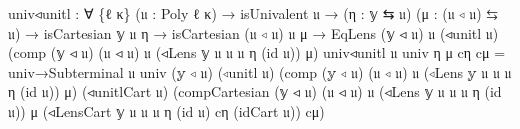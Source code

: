 \documentclass[
  11pt,
  oneside,
  article]{memoir}
\newenvironment{Shaded}{}{}
\newcommand{\NormalTok}[1]{#1}
\newcommand{\OtherTok}[1]{\textcolor[rgb]{0.00,0.44,0.13}{#1}}
\theoremstyle{definition}
\theoremstyle{plain}
\newcommand{\0}{\textsf{0}}
\newcommand{\1}{\tn{\textsf{1}}}
\begin{document}
\begin{Shaded}
\begin{Highlighting}[]
\NormalTok{univ◃unitl }\OtherTok{:} \OtherTok{∀} \OtherTok{\{}\NormalTok{ℓ κ}\OtherTok{\}} \OtherTok{(}\NormalTok{𝔲 }\OtherTok{:}\NormalTok{ Poly ℓ κ}\OtherTok{)} \OtherTok{→}\NormalTok{ isUnivalent 𝔲}
             \OtherTok{→} \OtherTok{(}\NormalTok{η }\OtherTok{:}\NormalTok{ 𝕪 ⇆ 𝔲}\OtherTok{)} \OtherTok{(}\NormalTok{μ }\OtherTok{:} \OtherTok{(}\NormalTok{𝔲 ◃ 𝔲}\OtherTok{)}\NormalTok{ ⇆ 𝔲}\OtherTok{)}
             \OtherTok{→}\NormalTok{ isCartesian 𝕪 𝔲 η }\OtherTok{→}\NormalTok{ isCartesian }\OtherTok{(}\NormalTok{𝔲 ◃ 𝔲}\OtherTok{)}\NormalTok{ 𝔲 μ}
             \OtherTok{→}\NormalTok{ EqLens }\OtherTok{(}\NormalTok{𝕪 ◃ 𝔲}\OtherTok{)}\NormalTok{ 𝔲 }
                      \OtherTok{(}\NormalTok{◃unitl 𝔲}\OtherTok{)}
                      \OtherTok{(}\NormalTok{comp }\OtherTok{(}\NormalTok{𝕪 ◃ 𝔲}\OtherTok{)} \OtherTok{(}\NormalTok{𝔲 ◃ 𝔲}\OtherTok{)}\NormalTok{ 𝔲}
                            \OtherTok{(}\NormalTok{◃Lens 𝕪 𝔲 𝔲 𝔲 η }\OtherTok{(}\NormalTok{id 𝔲}\OtherTok{))}\NormalTok{ μ}\OtherTok{)}
\NormalTok{univ◃unitl 𝔲 univ η μ cη cμ }\OtherTok{=}
\NormalTok{    univ→Subterminal }
\NormalTok{        𝔲 univ }\OtherTok{(}\NormalTok{𝕪 ◃ 𝔲}\OtherTok{)} \OtherTok{(}\NormalTok{◃unitl 𝔲}\OtherTok{)}
        \OtherTok{(}\NormalTok{comp }\OtherTok{(}\NormalTok{𝕪 ◃ 𝔲}\OtherTok{)} \OtherTok{(}\NormalTok{𝔲 ◃ 𝔲}\OtherTok{)}\NormalTok{ 𝔲 }
              \OtherTok{(}\NormalTok{◃Lens 𝕪 𝔲 𝔲 𝔲 η }\OtherTok{(}\NormalTok{id 𝔲}\OtherTok{))}\NormalTok{ μ}\OtherTok{)} 
        \OtherTok{(}\NormalTok{◃unitlCart 𝔲}\OtherTok{)} 
        \OtherTok{(}\NormalTok{compCartesian }\OtherTok{(}\NormalTok{𝕪 ◃ 𝔲}\OtherTok{)} \OtherTok{(}\NormalTok{𝔲 ◃ 𝔲}\OtherTok{)}\NormalTok{ 𝔲}
                       \OtherTok{(}\NormalTok{◃Lens 𝕪 𝔲 𝔲 𝔲 η }\OtherTok{(}\NormalTok{id 𝔲}\OtherTok{))}\NormalTok{ μ }
                       \OtherTok{(}\NormalTok{◃LensCart 𝕪 𝔲 𝔲 𝔲 η }\OtherTok{(}\NormalTok{id 𝔲}\OtherTok{)} 
\NormalTok{                                  cη }\OtherTok{(}\NormalTok{idCart 𝔲}\OtherTok{))}\NormalTok{ cμ}\OtherTok{)}


\end{Highlighting}
\end{Shaded}
\end{document}
